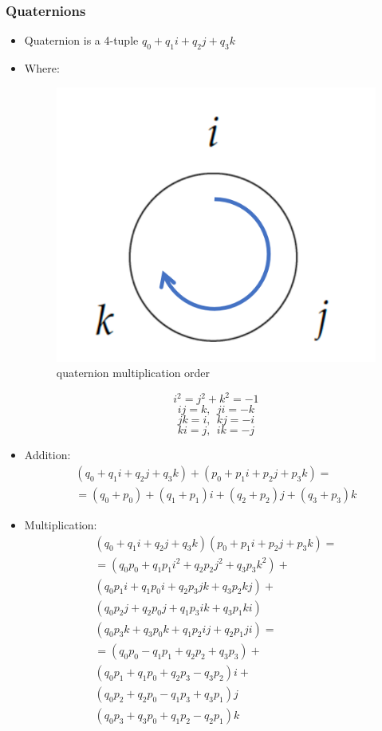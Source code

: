 \documentclass{article}
\begin{document}
\subsubsection{Quaternions}
\begin{itemize}
    \item Quaternion is a 4-tuple $ q_0 +q_1 i+ q_2 j + q_3 k $
    \item Where: \\
    \begin{figure}[h!]
    \centering
    \includegraphics[scale=0.9]{quatOrder.png}
    \caption{quaternion multiplication order}
    \label{fig:sr}
    \end{figure}
    $$ i^2 = j^2 + k^2 = -1 $$
    $$ ij=k,\:\: ji=-k $$
    $$ jk=i,\:\: kj=-i $$
    $$ ki=j,\:\: ik=-j $$
    \item Addition:
    \begin{gather*} 
    (q_0+q_1i+q_2j+q_3k) + (p_0+p_1i+p_2j+p_3k) = \\
    = (q_0 + p_0) + (q_1 + p_1)i + (q_2 + p_2)j + (q_3 + p_3)k
    \end{gather*}
    
    \item Multiplication:
    \begin{gather*}
        (q_0+q_1i+q_2j+q_3k)(p_0+p_1i+p_2j+p_3k) = \\
        = (q_0p_0 + q_1p_1i^2 + q_2p_2j^2 + q_3p_3k^2) + \\
        (q_0p_1i + q_1p_0i + q_2p_3jk + q_3p_2kj) + \\
        (q_0p_2j + q_2p_0j + q_1p_3ik + q_3p_1ki) \\
        (q_0p_3k + q_3p_0k + q_1p_2ij + q_2p_1ji) = \\
        = (q_0p_0 - q_1p_1 + q_2p_2 + q_3p_3) + \\
        (q_0p_1 + q_1p_0 + q_2p_3 - q_3p_2)i + \\
        (q_0p_2 + q_2p_0 - q_1p_3 + q_3p_1)j \\
        (q_0p_3 + q_3p_0 + q_1p_2 - q_2p_1)k 
    \end{gather*}
    

\end{itemize}
\end{document}
